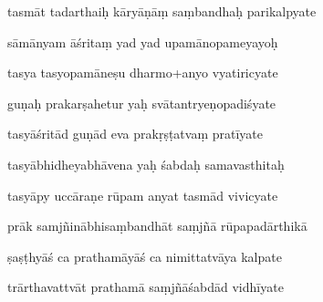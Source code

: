 \documentclass[article,12pt,a4paper]{memoir}%
\newcounter{parCount}
\begin{document}
	  
	  \pstart \leavevmode%
	tasmāt tadarthaiḥ kāryāṇāṃ saṃbandhaḥ parikalpyate 
	{}
	\pend%
      

	  
	  \pstart {} sāmānyam āśritaṃ yad yad upamānopameyayoḥ 
	{}
	\pend%
      

	  
	  \pstart \leavevmode%
	tasya tasyopamāneṣu dharmo+anyo vyatiricyate 
	{}
	\pend%
      

	  
	  \pstart {} guṇaḥ prakarṣahetur yaḥ svātantryeṇopadiśyate 
	{}
	\pend%
      

	  
	  \pstart \leavevmode%
	tasyāśritād guṇād eva prakṛṣṭatvaṃ pratīyate 
	{}
	\pend%
      

	  
	  \pstart {} tasyābhidheyabhāvena yaḥ śabdaḥ samavasthitaḥ 
	{}
	\pend%
      

	  
	  \pstart \leavevmode%
	tasyāpy uccāraṇe rūpam anyat tasmād vivicyate 
	{}
	\pend%
      

	  
	  \pstart {} prāk samjñinābhisaṃbandhāt saṃjñā rūpapadārthikā 
	{}
	\pend%
      

	  
	  \pstart \leavevmode%
	ṣaṣṭhyāś ca prathamāyāś ca nimittatvāya kalpate 
	{}
	\pend%
      

	  
	  \pstart {} trārthavattvāt prathamā saṃjñāśabdād vidhīyate 
	{}
	\pend%
      
\end{document}
